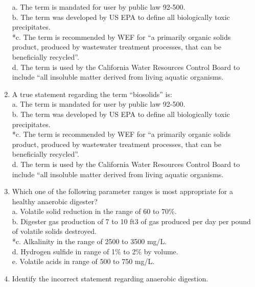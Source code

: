 \documentclass{article}
\begin{document}
\begin{enumerate}
a. The term is mandated for user by public law 92-500. \\
b. The term was developed by US EPA to define all biologically toxic precipitates. \\
*c. The term is recommended by WEF for “a primarily organic solids product, produced by wastewater treatment processes, that can be beneficially recycled”. \\
d. The term is used by the California Water Resources Control Board to include “all insoluble matter derived from living aquatic organisms. \\

\item  A true statement regarding the term “biosolids” is: \\

a. The term is mandated for user by public law 92-500. \\
b. The term was developed by US EPA to define all biologically toxic precipitates. \\
*c. The term is recommended by WEF for “a primarily organic solids product, produced by wastewater treatment processes, that can be beneficially recycled”. \\
d. The term is used by the California Water Resources Control Board to include “all insoluble matter derived from living aquatic organisms. \\

\item  Which one of the following parameter ranges is most appropriate for a healthy anaerobic digester? \\

a. Volatile solid reduction in the range of 60 to 70\%. \\
b. Digester gas production of 7 to 10 ft3 of gas produced per day per pound of volatile solids destroyed. \\
*c. Alkalinity in the range of 2500 to 3500 mg/L. \\
d. Hydrogen sulfide in range of 1\% to 2\% by volume. \\
e. Volatile acids in range of 500 to 750 mg/L. \\

\item  Identify the incorrect statement regarding anaerobic digestion. \\


\end{enumerate}
\end{document}
